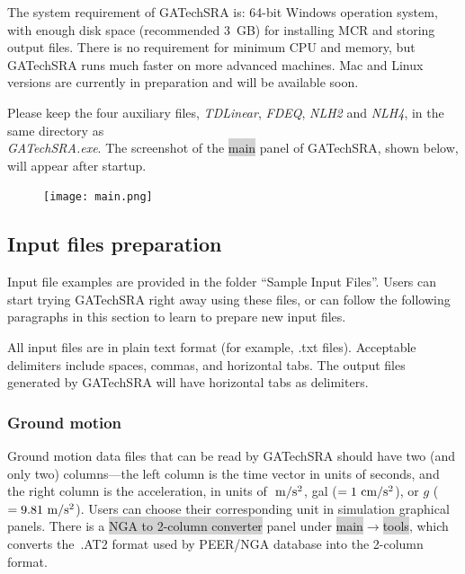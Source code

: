 \documentclass[11pt,letterpaper]{article}
\newcommand{\panel}[1]{\colorbox{lightgray}{\textsf{#1}}}
\begin{document}
The system requirement of GATechSRA is: 64-bit Windows operation system, with enough disk space (recommended 3~GB) for installing MCR and storing output files. There is no requirement for minimum CPU and memory, but GATechSRA runs much faster on more advanced machines. Mac and Linux versions are currently in preparation and will be available soon.

Please keep the four auxiliary files, \emph{\textsf{TDLinear}}, \emph{\textsf{FDEQ}}, \emph{\textsf{NLH2}} and \emph{\textsf{NLH4}}, in the same directory as \\\emph{\textsf{{GATechSRA.exe}}}.
The screenshot of the \panel{main} panel of GATechSRA, shown below, will appear after startup.

\begin{figure}[H]
\centering
  \texttt{[image: main.png]}\\
\end{figure}

\newpage
\subsection{Input files preparation}

Input file examples are provided in the folder ``Sample Input Files''. Users can start trying GATechSRA right away using these files, or can follow the following paragraphs in this section to learn to prepare new input files.

All input files are in plain text format (for example, \textsf{.txt} files). Acceptable delimiters include spaces, commas, and horizontal tabs. The output files generated by GATechSRA will have horizontal tabs as delimiters.

\subsubsection{Ground motion}\label{sec:motion_file}

Ground motion data files that can be read by GATechSRA should have two (and only two) columns---the left column is the time vector in units of seconds, and the right column is the acceleration, in units of $~\mathrm{m/s^2}$, gal ($=1~\mathrm{cm/s^2}$), or $g$ ($=9.81~\mathrm{m/s^2}$). Users can choose their corresponding unit in simulation graphical panels. There is a \panel{NGA to 2-column converter} panel under \panel{main}$\rightarrow$\panel{tools}, which converts the~\textsf{.AT2} format used by PEER/NGA database into the 2-column format.
\end{document}
